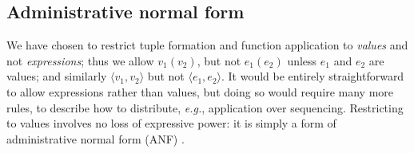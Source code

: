 \documentclass[acmsmall,review,dvipsnames]{acmart}
\newcommand{\Varid}[1]{\mathit{#1}}
\newcommand{\eg}{\emph{e.g.}}
\newcommand{\versecalc}{$\mathcal{VC}$}
\newcommand{\rulename}[1]{\textsc{\small #1}}
\newcommand{\movesto}{\longrightarrow}
\begin{document}
% 
% 


\subsection{Administrative normal form}

We have chosen to restrict tuple formation and function application to
\emph{values} and not \emph{expressions}; thus we allow \ensuremath{\Varid{v}_{\mathrm{1}}(\Varid{v}_{\mathrm{2}})}, but not \ensuremath{\Varid{e}_{\mathrm{1}}(\Varid{e}_{\mathrm{2}})} unless
\ensuremath{\Varid{e}_{\mathrm{1}}} and \ensuremath{\Varid{e}_{\mathrm{2}}} are values; and similarly \ensuremath{\langle{}\Varid{v}_{\mathrm{1}},\Varid{v}_{\mathrm{2}}\rangle} but not \ensuremath{\langle{}\Varid{e}_{\mathrm{1}},\Varid{e}_{\mathrm{2}}\rangle}.
It would be entirely straightforward to allow expressions rather than values, but doing so
would require many more rules, to describe how to distribute, {\eg}, application over sequencing.
Restricting to values involves no loss of expressive power:
it is simply a form of administrative normal form (ANF) \cite{felleisen:anf}.
\end{document}
